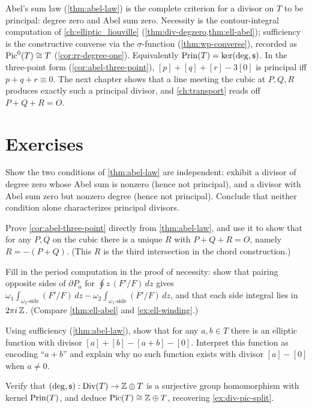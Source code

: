 Abel's sum law (\cref{thm:abel-law}) is the complete criterion for a divisor on
\(T\) to be principal: degree zero and Abel sum zero. Necessity is the
contour-integral computation of \cref{ch:elliptic_liouville}
(\cref{thm:div-degzero,thm:ell-abel}); sufficiency is the constructive converse via
the \(\sigma\)-function (\cref{thm:wp-converse}), recorded as
\(\operatorname{Pic}^0(T) \cong T\) (\cref{cor:rr-degree-one}). Equivalently
\(\operatorname{Prin}(T) = \ker(\deg, \mathfrak{s})\). In the
three-point form (\cref{cor:abel-three-point}), \([p]+[q]+[r]-3[0]\) is principal
iff \(p+q+r \equiv 0\). The next chapter shows that a line meeting the cubic at
\(P, Q, R\) produces exactly such a principal divisor, and
\cref{ch:transport} reads off \(P + Q + R = O\).

\section*{Exercises}

\begin{exercise}
\label{ex:abel-independence}
Show the two conditions of \cref{thm:abel-law} are independent: exhibit a divisor
of degree zero whose Abel sum is nonzero (hence not principal), and a divisor with
Abel sum zero but nonzero degree (hence not principal). Conclude that neither
condition alone characterizes principal divisors.
\end{exercise}

\begin{exercise}
\label{ex:abel-three-point}
Prove \cref{cor:abel-three-point} directly from \cref{thm:abel-law}, and use it to
show that for any \(P, Q\) on the cubic there is a unique \(R\) with
\(P + Q + R = O\), namely \(R = -(P+Q)\). (This \(R\) is the third intersection
in the chord construction.)
\end{exercise}

\begin{exercise}
\label{ex:abel-period-integral}
Fill in the period computation in the proof of necessity: show that pairing
opposite sides of \(\partial P_a\) for \(\oint z\,(F'/F)\,dz\) gives
\(\omega_1 \int_{\omega_2\text{-side}} (F'/F)\,dz - \omega_2 \int_{\omega_1\text{-side}}
(F'/F)\,dz\), and that each side integral lies in \(2\pi i\,\mathbb{Z}\). (Compare
\cref{thm:ell-abel} and \cref{ex:ell-winding}.)
\end{exercise}

\begin{exercise}
\label{ex:abel-addition-function}
Using sufficiency (\cref{thm:abel-law}), show that for any \(a, b \in T\) there is
an elliptic function with divisor \([a] + [b] - [a+b] - [0]\). Interpret this
function as encoding ``\(a + b\)'' and explain why no such function exists with
divisor \([a] - [0]\) when \(a \ne 0\).
\end{exercise}

\begin{exercise}
\label{ex:abel-kernel}
Verify that \((\deg, \mathfrak{s}) : \operatorname{Div}(T) \to \mathbb{Z} \oplus T\) is a surjective group
homomorphism with kernel \(\operatorname{Prin}(T)\), and deduce \(\operatorname{Pic}(T) \cong \mathbb{Z} \oplus T\),
recovering \cref{ex:div-pic-split}.
\end{exercise}
